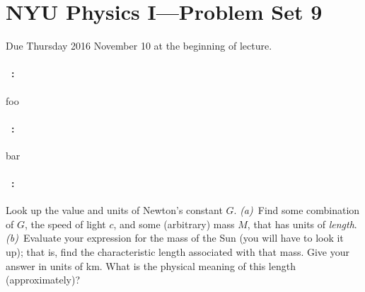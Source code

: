 \documentclass[12pt]{article}
\begin{document}
\section*{NYU Physics I---Problem Set 9}

Due Thursday 2016 November 10 at the beginning of lecture.

\paragraph{\problemname~\theproblem:}%
foo

\paragraph{\problemname~\theproblem:}%
bar

\paragraph{\problemname~\theproblem:}%
Look up the value and units of Newton's constant $G$.
\textsl{(a)}~Find some combination of $G$, the speed of light $c$, and
some (arbitrary) mass $M$, that has units of \emph{length}.
\textsl{(b)}~Evaluate your expression for the mass of the Sun (you
will have to look it up); that is, find the characteristic length
associated with that mass.  Give your answer in units of km.  What is
the physical meaning of this length (approximately)?
\end{document}
